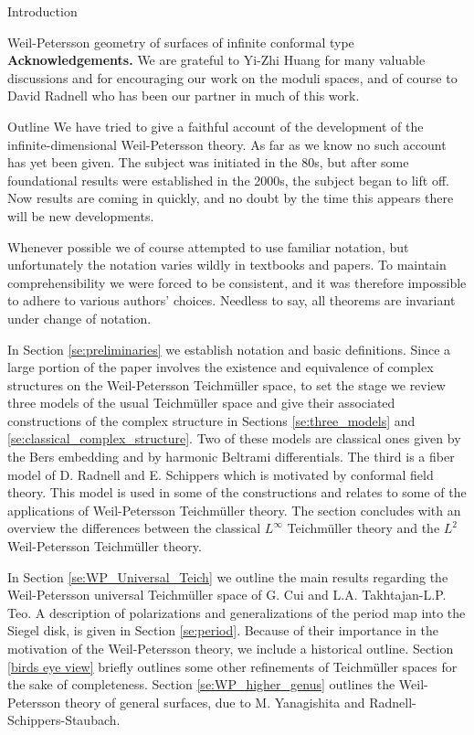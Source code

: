 \documentclass[12pt]{amsart}
\theoremstyle{plain}
\theoremstyle{definition}
\theoremstyle{remark}
\numberwithin{equation}{section} %
\numberwithin{figure}{section} %
\begin{document}
\begin{section}{Introduction}
\begin{subsection}{Weil-Petersson geometry of surfaces of infinite conformal type}
\textbf{Acknowledgements.} {We are grateful to Yi-Zhi Huang for many valuable discussions and for encouraging our work on the moduli spaces, and of course to David Radnell who has been our partner in much of this work.}



\end{subsection}
\begin{subsection}{Outline} 
  We have tried to give a faithful account of the development of the infinite-dimensional Weil-Petersson theory. As far as we know no such account has yet been given.  The subject was initiated in the 80s, but after some foundational results were established in the 2000s, the subject began to lift off. Now results are coming in quickly, and no doubt by the time this appears there will be new developments.

  Whenever possible we of course attempted to use familiar notation, but unfortunately the notation varies wildly in textbooks and papers. To maintain comprehensibility we were forced to be consistent, and it was therefore impossible to adhere to various authors' choices. Needless to say, all theorems are invariant under change of notation.   

  In Section \ref{se:preliminaries} we establish notation and basic definitions. Since a large portion of the paper involves the existence and equivalence of complex structures on the Weil-Petersson Teichm\"uller space, to set the stage we review three models of the usual Teichm\"uller space and give their associated constructions of the complex structure in Sections \ref{se:three_models} and \ref{se:classical_complex_structure}.  Two of these models are classical ones given by the Bers embedding and by harmonic Beltrami differentials. The third is a fiber model of D. Radnell and E. Schippers \cite{RadnellSchippers_fiber} which is motivated by conformal field theory. This model is used in some of the constructions and relates to some of the applications of Weil-Petersson Teichm\"uller theory.  The section concludes with an overview the differences between the classical $L^\infty$ Teichm\"uller theory and the $L^2$ Weil-Petersson Teichm\"uller theory. 

  In Section \ref{se:WP_Universal_Teich} we outline the main results regarding the Weil-Petersson universal Teichm\"uller space of G. Cui and L.A. Takhtajan-L.P. Teo. A description of polarizations and generalizations of the period map into the Siegel disk, is given in Section  \ref{se:period}. Because of their importance in the motivation of the Weil-Petersson theory, we include a historical outline.  Section \ref{birds eye view} briefly outlines some other refinements of Teichm\"uller spaces for the sake of completeness.  Section \ref{se:WP_higher_genus} outlines the Weil-Petersson theory of general surfaces, due to M. Yanagishita and Radnell-Schippers-Staubach.
  

\end{subsection}
\end{section}
\end{document}
